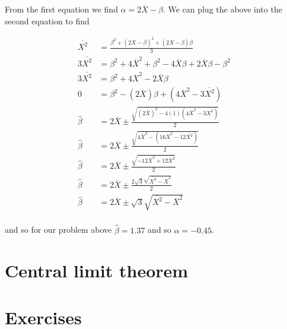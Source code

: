\begin{VT1}
From the first equation we find $\alpha = 2\overline{X} - \beta$. 
We can plug the above into the second equation to find 

\begin{align}
    \overline{X^{2}} &=  \frac{\beta^{2} + (2\overline{X} - \beta)^{2} + (2\overline{X} - \beta)\beta}{3}\\
    3\overline{X^{2}} &= \beta^{2} + 4 \overline{X}^{2} + \beta^{2} - 4\overline{X} \beta + 2\overline{X} \beta - \beta^{2}\\
    3\overline{X^{2}} &= \beta^{2} + 4 \overline{X}^{2} - 2\overline{X} \beta \\  
    0&= \beta^{2} - (2\overline{X}) \beta + (4 \overline{X}^{2} - 3\overline{X^{2}})\\
    \hat{\beta} &= 2\overline{X} \pm \frac{\sqrt{ (2\overline{X})^{2} - 4(1)(4 \overline{X}^{2} - 3\overline{X^{2}}) } }{2} \\ 
    \hat{\beta} &= 2\overline{X} \pm \frac{\sqrt{ 4\overline{X}^{2} - (16 \overline{X}^{2} - 12\overline{X^{2}}) } }{2} \\
    \hat{\beta} &= 2\overline{X} \pm \frac{\sqrt{ - 12 \overline{X}^{2} + 12\overline{X^{2}} } }{2} \\
    \hat{\beta} &= 2\overline{X} \pm \frac{ 2\sqrt{3} \sqrt{    \overline{X^{2}} -\overline{X}^{2} } }{2} \\
    \hat{\beta} &= 2\overline{X} \pm \sqrt{3} \sqrt{    \overline{X^{2}} -\overline{X}^{2} } \\
\end{align}

and so for our problem above $\hat{\beta} = 1.37$ and so $\alpha = -0.45$.





\end{VT1}



\section{Central limit theorem}\label{intro}


\section{Exercises}


